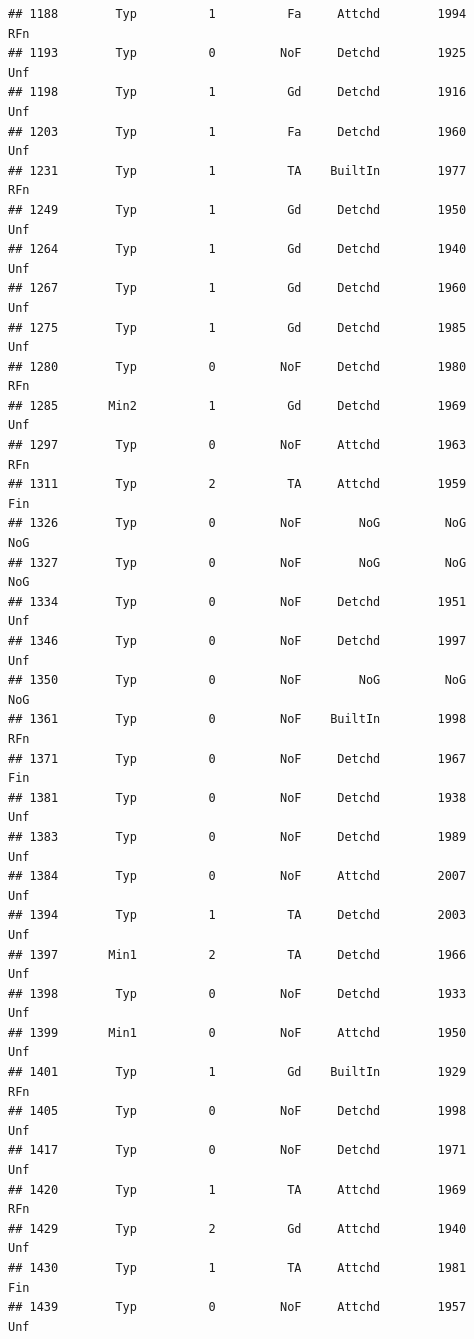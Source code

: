 \documentclass[]{article}
\begin{document}
\begin{verbatim}
## 1188        Typ          1          Fa     Attchd        1994          RFn
## 1193        Typ          0         NoF     Detchd        1925          Unf
## 1198        Typ          1          Gd     Detchd        1916          Unf
## 1203        Typ          1          Fa     Detchd        1960          Unf
## 1231        Typ          1          TA    BuiltIn        1977          RFn
## 1249        Typ          1          Gd     Detchd        1950          Unf
## 1264        Typ          1          Gd     Detchd        1940          Unf
## 1267        Typ          1          Gd     Detchd        1960          Unf
## 1275        Typ          1          Gd     Detchd        1985          Unf
## 1280        Typ          0         NoF     Detchd        1980          RFn
## 1285       Min2          1          Gd     Detchd        1969          Unf
## 1297        Typ          0         NoF     Attchd        1963          RFn
## 1311        Typ          2          TA     Attchd        1959          Fin
## 1326        Typ          0         NoF        NoG         NoG          NoG
## 1327        Typ          0         NoF        NoG         NoG          NoG
## 1334        Typ          0         NoF     Detchd        1951          Unf
## 1346        Typ          0         NoF     Detchd        1997          Unf
## 1350        Typ          0         NoF        NoG         NoG          NoG
## 1361        Typ          0         NoF    BuiltIn        1998          RFn
## 1371        Typ          0         NoF     Detchd        1967          Fin
## 1381        Typ          0         NoF     Detchd        1938          Unf
## 1383        Typ          0         NoF     Detchd        1989          Unf
## 1384        Typ          0         NoF     Attchd        2007          Unf
## 1394        Typ          1          TA     Detchd        2003          Unf
## 1397       Min1          2          TA     Detchd        1966          Unf
## 1398        Typ          0         NoF     Detchd        1933          Unf
## 1399       Min1          0         NoF     Attchd        1950          Unf
## 1401        Typ          1          Gd    BuiltIn        1929          RFn
## 1405        Typ          0         NoF     Detchd        1998          Unf
## 1417        Typ          0         NoF     Detchd        1971          Unf
## 1420        Typ          1          TA     Attchd        1969          RFn
## 1429        Typ          2          Gd     Attchd        1940          Unf
## 1430        Typ          1          TA     Attchd        1981          Fin
## 1439        Typ          0         NoF     Attchd        1957          Unf

\end{verbatim}
\end{document}
